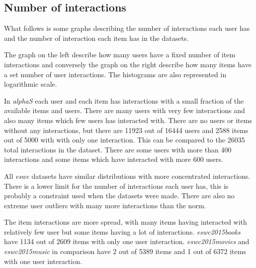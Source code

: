 
\subsection{Number of interactions}\label{sec:result:interactions}

What follows is some graphs describing the number of interactions each user has and the number of interaction each item has in the datasets.

The graph on the left describe how many users have a fixed number of item interactions and conversely the graph on the right describe how many items have a set number of user interactions. The histograms are also represented in logarithmic scale.

\FloatBarrier


In \textit{alphaS} each user and each item has interactions with a small fraction of the available items and users. There are many users with very few interactions and also many items which few users has interacted with. There are no users or items without any interactions, but there are 11923 out of 16444 users and 2588 items out of 5000 with with only one interaction. This can be compared to the 26035 total interactions in the dataset. There are some users with more than 400 interactions and some items which have interacted with more 600 users.

\newpage




\FloatBarrier

All \textit{eswc} datasets have similar distributions with more concentrated interactions. There is a lower limit for the number of interactions each user has, this is probably a constraint used when the datasets were made.
There are also no extreme user outliers with many more interactions than the norm.

The item interactions are more spread, with many items having interacted with relatively few user but some items having a lot of interactions. \textit{eswc2015books} have 1134 out of 2609 items with only one user interaction. \textit{eswc2015movies} and \textit{eswc2015music} in comparison have 2 out of 5389 items and 1 out of 6372 items with one user interaction.


